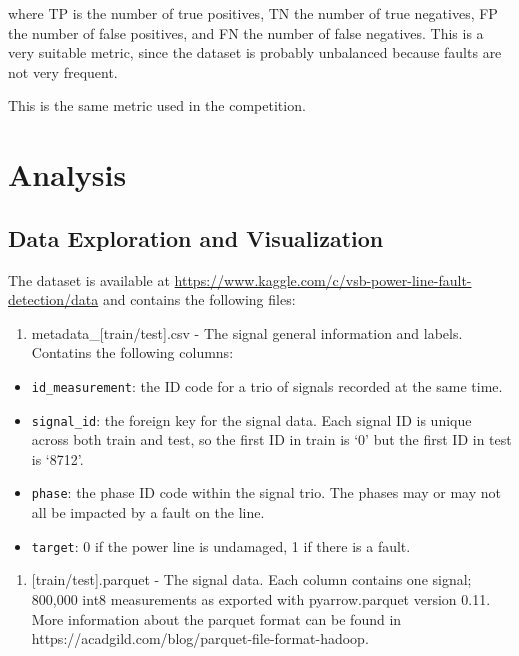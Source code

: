 \documentclass[11pt]{article}
\providecommand{\tightlist}{%
      \setlength{\itemsep}{0pt}\setlength{\parskip}{0pt}}
\begin{document}
where TP is the number of true positives, TN the number of true
negatives, FP the number of false positives, and FN the number of false
negatives. This is a very suitable metric, since the dataset is probably
unbalanced because faults are not very frequent.

This is the same metric used in the competition.

    \hypertarget{ii.-analysis}{%
\section{Analysis}\label{ii.-analysis}}

\hypertarget{data-exploration-and-visualization}{%
\subsection{Data Exploration and
Visualization}\label{data-exploration-and-visualization}}

The dataset is available at \href{https://www.kaggle.com/c/vsb-power-line-fault-detection/data}{https://www.kaggle.com/c/vsb-power-line-fault-detection/data} and contains the following files:

\begin{enumerate}
\def\labelenumi{\alph{enumi})}
\tightlist
\item
  metadata\_{[}train/test{]}.csv - The signal general information and
  labels. Contatins the following columns:
\end{enumerate}

\begin{itemize}
\item
  \texttt{id\_measurement}: the ID code for a trio of signals recorded
  at the same time.
\item
  \texttt{signal\_id}: the foreign key for the signal data. Each signal
  ID is unique across both train and test, so the first ID in train is
  `0' but the first ID in test is `8712'.
\item
  \texttt{phase}: the phase ID code within the signal trio. The phases
  may or may not all be impacted by a fault on the line.
\item
  \texttt{target}: 0 if the power line is undamaged, 1 if there is a
  fault.
\end{itemize}

\begin{enumerate}
\def\labelenumi{\alph{enumi})}
\setcounter{enumi}{1}
\tightlist
\item
  {[}train/test{]}.parquet - The signal data. Each column contains one
  signal; 800,000 int8 measurements as exported with pyarrow.parquet
  version 0.11. More information about the parquet format can be found
  in https://acadgild.com/blog/parquet-file-format-hadoop.
\end{enumerate}
\end{document}
